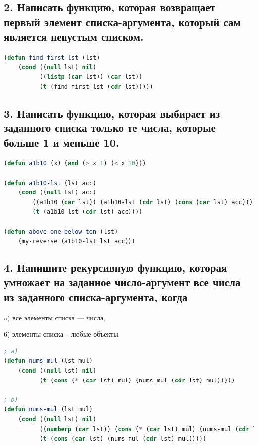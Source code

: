 \documentclass[12pt]{report}
\begin{document}
\subsection*{2. Написать функцию, которая возвращает первый элемент списка-аргумента, который сам
	является непустым списком.}

\begin{lstlisting}[label=6xd, caption=Решение задания №2, language=lisp]
(defun find-first-lst (lst) 
	(cond ((null lst) nil)
		  ((listp (car lst)) (car lst)) 
		  (t (find-first-lst (cdr lst)))))

\end{lstlisting}

\subsection*{3. Написать функцию, которая выбирает из заданного списка только те числа, которые
	больше 1 и меньше 10.}

\begin{lstlisting}[label=6xd, caption=Решение задания №3, language=lisp]
(defun a1b10 (x) (and (> x 1) (< x 10)))

(defun a1b10-lst (lst acc) 
	(cond ((null lst) acc) 
		((a1b10 (car lst)) (a1b10-lst (cdr lst) (cons (car lst) acc))) 
		(t (a1b10-lst (cdr lst) acc))))
		
(defun above-one-below-ten (lst)
	(my-reverse (a1b10-lst lst acc)))

\end{lstlisting}

\subsection*{4. Напишите рекурсивную функцию, которая умножает на заданное число-аргумент все
	числа
	из заданного списка-аргумента, когда}

a) все элементы списка --- числа,

6) элементы списка -- любые объекты.

\begin{lstlisting}[label=6xd, caption=Решение задания №4, language=lisp]
; a)
(defun nums-mul (lst mul) 
	(cond ((null lst) nil)
		  (t (cons (* (car lst) mul) (nums-mul (cdr lst) mul)))))

; b)
(defun nums-mul (lst mul)
	(cond ((null lst) nil)
		  ((numberp (car lst)) (cons (* (car lst) mul) (nums-mul (cdr lst) mul)))
		  (t (cons (car lst) (nums-mul (cdr lst) mul)))))

\end{lstlisting}
\end{document}
